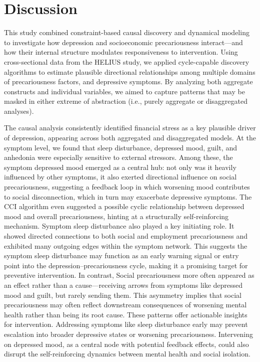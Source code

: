 \documentclass[
]{article}
\begin{document}
\section{Discussion}\label{discussion}

This study combined constraint-based causal discovery and dynamical
modeling to investigate how depression and socioeconomic precariousness
interact---and how their internal structure modulates responsiveness to
intervention. Using cross-sectional data from the HELIUS study, we
applied cycle-capable discovery algorithms to estimate plausible
directional relationships among multiple domains of precariousness
factors, and depressive symptoms. By analyzing both aggregate constructs
and individual variables, we aimed to capture patterns that may be
masked in either extreme of abstraction (i.e., purely aggregate or
disaggregated analyses).

The causal analysis consistently identified financial stress as a key
plausible driver of depression, appearing across both aggregated and
disaggregated models. At the symptom level, we found that sleep
disturbance, depressed mood, guilt, and anhedonia were especially
sensitive to external stressors. Among these, the symptom depressed mood
emerged as a central hub: not only was it heavily influenced by other
symptoms, it also exerted directional influence on social
precariousness, suggesting a feedback loop in which worsening mood
contributes to social disconnection, which in turn may exacerbate
depressive symptoms. The CCI algorithm even suggested a possible cyclic
relationship between depressed mood and overall precariousness, hinting
at a structurally self-reinforcing mechanism. Symptom sleep disturbance
also played a key initiating role. It showed directed connections to
both social and employment precariousness and exhibited many outgoing
edges within the symptom network. This suggests the symptom sleep
disturbance may function as an early warning signal or entry point into
the depression--precariousness cycle, making it a promising target for
preventive intervention. In contrast, Social precariousness more often
appeared as an effect rather than a cause---receiving arrows from
symptoms like depressed mood and guilt, but rarely sending them. This
asymmetry implies that social precariousness may often reflect
downstream consequences of worsening mental health rather than being its
root cause. These patterns offer actionable insights for intervention.
Addressing symptoms like sleep disturbance early may prevent escalation
into broader depressive states or worsening precariousness. Intervening
on depressed mood, as a central node with potential feedback effects,
could also disrupt the self-reinforcing dynamics between mental health
and social isolation.
\end{document}
